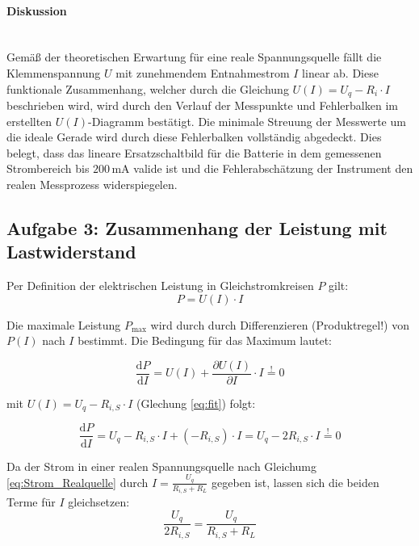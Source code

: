 \documentclass[12pt,a4paper,titlepage]{scrartcl}
\numberwithin{equation}{section}
\numberwithin{table}{section}
\numberwithin{figure}{section}
\begin{document}
\paragraph{Diskussion}\mbox{}\\
Gemäß der theoretischen Erwartung für eine reale Spannungsquelle fällt die Klemmenspannung $U$ mit zunehmendem Entnahmestrom $I$ linear ab.
Diese funktionale Zusammenhang, welcher durch die Gleichung $U(I) = U_q - R_i \cdot I$ beschrieben wird, wird durch den Verlauf
der Messpunkte und Fehlerbalken im erstellten $U(I)$-Diagramm bestätigt.
Die minimale Streuung der Messwerte um die ideale Gerade wird durch diese Fehlerbalken vollständig abgedeckt.
Dies belegt, dass das lineare Ersatzschaltbild für die Batterie in dem gemessenen Strombereich bis $200\,\si{\milli\ampere}$ valide ist und die 
Fehlerabschätzung der Instrument den realen Messprozess widerspiegelen.


\subsection{Aufgabe 3: Zusammenhang der Leistung mit Lastwiderstand}
Per Definition der elektrischen Leistung in Gleichstromkreisen $P$ gilt:
\begin{equation}
    P = U(I) \cdot I
\end{equation}



Die maximale Leistung $P_\text{max}$ wird durch durch Differenzieren (Produktregel!) von $P(I)$ nach $I$ bestimmt.
Die Bedingung für das Maximum lautet:

\begin{equation}
   \frac{\mathrm{d}P}{\mathrm{d}I} = U(I) + \frac{\partial U(I)}{\partial I} \cdot I \overset{!}{=} 0
\end{equation}

mit $U(I) = U_q - R_{i{,}S} \cdot I$ (Glechung \ref{eq:fit}) folgt:

\begin{equation}
    \frac{\mathrm{d}P}{\mathrm{d}I} = U_q - R_{i{,}S} \cdot I + (-R_{i{,}S}) \cdot I = U_q - 2 R_{i{,}S} \cdot I \overset{!}{=} 0\label{eq:dPDI}
\end{equation}

Da der Strom in einer realen Spannungsquelle nach Gleichumg \ref{eq:Strom_Realquelle} durch $I = \frac{U_q}{R_{i{,}S} + R_L}$ gegeben ist, lassen sich die beiden Terme für $I$ gleichsetzen:
\begin{equation}
    \frac{U_q}{2 R_{i{,}S}} = \frac{U_q}{R_{i{,}S} + R_L}
\end{equation}
\end{document}
